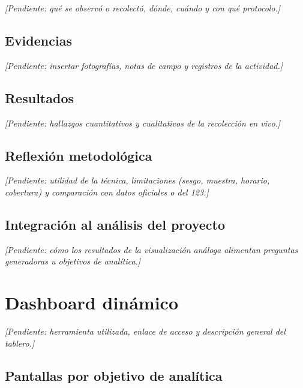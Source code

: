 \documentclass[12pt,letterpaper]{article}
\begin{document}
\textit{[Pendiente: qué se observó o recolectó, dónde, cuándo y con qué protocolo.]}

\subsection{Evidencias}

\textit{[Pendiente: insertar fotografías, notas de campo y registros de la actividad.]}

\subsection{Resultados}

\textit{[Pendiente: hallazgos cuantitativos y cualitativos de la recolección en vivo.]}

\subsection{Reflexión metodológica}

\textit{[Pendiente: utilidad de la técnica, limitaciones (sesgo, muestra, horario, cobertura) y comparación con datos oficiales o del 123.]}

\subsection{Integración al análisis del proyecto}

\textit{[Pendiente: cómo los resultados de la visualización análoga alimentan preguntas generadoras u objetivos de analítica.]}

\section{Dashboard dinámico}

\textit{[Pendiente: herramienta utilizada, enlace de acceso y descripción general del tablero.]}

\subsection{Pantallas por objetivo de analítica}
\end{document}
